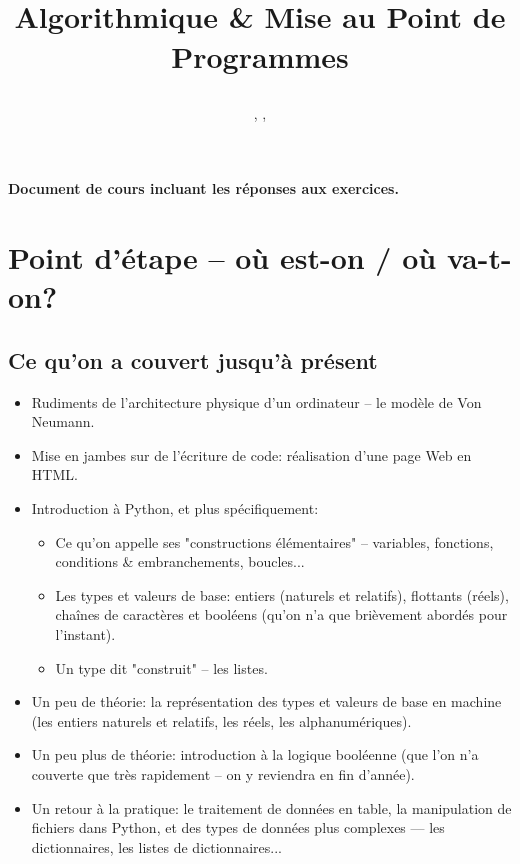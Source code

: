 \documentclass[12pt]{article}
\title
	{\vspace{3cm}
		{\Large
		\textit
			{
				\classe\hspace{0.1cm}
				\textemdash\
				\hspace{0.1cm}
				\themecours
			}
			
		\vspace{1cm}
		\huge{Algorithmique \& Mise au Point de Programmes} }
		 
		\vspace{1cm}
	}
\author{\etablissement}
\date{
	\auteur,
	\datedoc,
	\footnotesize{\textit{\versiondoc}} 
	\vspace{6cm}
	}
\begin{document}
	
	\maketitle
	\thispagestyle{empty}
		
	\section*{}
		{\noindent
		\resumecours
		}
	
	\vspace{\baselineskip}
	\begin{MaReponse}
		\centering
		\vspace{\baselineskip}
		\textbf{Document de cours incluant les réponses aux exercices.}
		\vspace{\baselineskip}
	\end{MaReponse}
		
	\pagebreak	
	\tableofcontents
	
	\pagebreak
	

	\section{Point d'étape -- où est-on / où va-t-on?}
	\subsection{Ce qu'on a couvert jusqu'à présent}
	
	\begin{itemize}
		\item Rudiments de l'architecture physique d'un ordinateur -- le modèle de Von Neumann.
		\item Mise en jambes sur de l'écriture de code: réalisation d'une page Web en HTML.
		\item Introduction à Python, et plus spécifiquement:
		\begin{itemize}
			\item Ce qu'on appelle ses "constructions élémentaires" -- variables, fonctions, conditions \& embranchements, boucles...
			\item Les types et valeurs de base: entiers (naturels et relatifs), flottants (réels), chaînes de caractères et booléens (qu'on n'a que brièvement abordés pour l'instant).
			\item Un type dit "construit" -- les listes.
		\end{itemize}
		\item Un peu de théorie: la représentation des types et valeurs de base en machine (les entiers naturels et relatifs, les réels, les alphanumériques).
		\item Un peu plus de théorie: introduction à la logique booléenne (que l'on n'a couverte que très rapidement -- on y reviendra en fin d'année).
		\item Un retour à la pratique: le traitement de données en table, la manipulation de fichiers dans Python, et des types de données plus complexes --- les dictionnaires, les listes de dictionnaires...
	\end{itemize}
	
\end{document}
